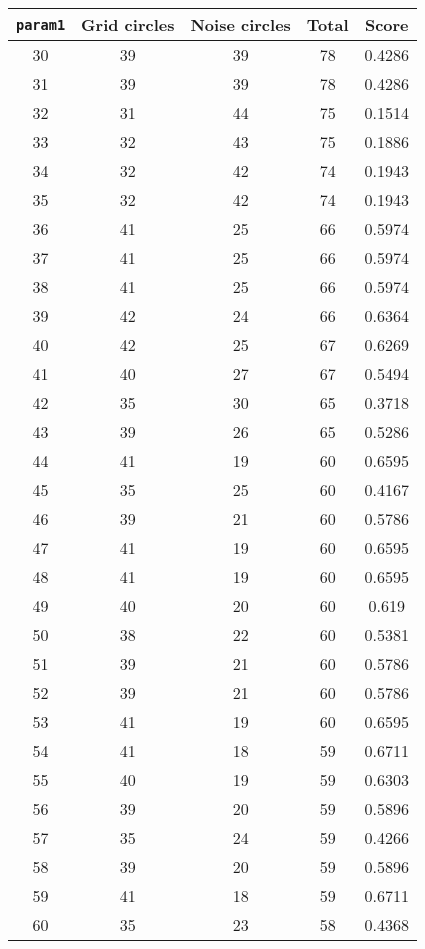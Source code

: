 \documentclass[letterpaper, 12pt]{article}
\begin{document}
\begin{longtable}{|c|c|c|c|c|}
\hline
\textbf{\texttt{param1}} & \textbf{Grid circles} & \textbf{Noise circles} & \textbf{Total} & \textbf{Score} \\
\hline
30 & 39 & 39 & 78 & 0.4286 \\
\hline
31 & 39 & 39 & 78 & 0.4286 \\
\hline
32 & 31 & 44 & 75 & 0.1514 \\
\hline
33 & 32 & 43 & 75 & 0.1886 \\
\hline
34 & 32 & 42 & 74 & 0.1943 \\
\hline
35 & 32 & 42 & 74 & 0.1943 \\
\hline
36 & 41 & 25 & 66 & 0.5974 \\
\hline
37 & 41 & 25 & 66 & 0.5974 \\
\hline
38 & 41 & 25 & 66 & 0.5974 \\
\hline
39 & 42 & 24 & 66 & 0.6364 \\
\hline
40 & 42 & 25 & 67 & 0.6269 \\
\hline
41 & 40 & 27 & 67 & 0.5494 \\
\hline
42 & 35 & 30 & 65 & 0.3718 \\
\hline
43 & 39 & 26 & 65 & 0.5286 \\
\hline
44 & 41 & 19 & 60 & 0.6595 \\
\hline
45 & 35 & 25 & 60 & 0.4167 \\
\hline
46 & 39 & 21 & 60 & 0.5786 \\
\hline
47 & 41 & 19 & 60 & 0.6595 \\
\hline
48 & 41 & 19 & 60 & 0.6595 \\
\hline
49 & 40 & 20 & 60 & 0.619 \\
\hline
50 & 38 & 22 & 60 & 0.5381 \\
\hline
51 & 39 & 21 & 60 & 0.5786 \\
\hline
52 & 39 & 21 & 60 & 0.5786 \\
\hline
53 & 41 & 19 & 60 & 0.6595 \\
\hline
54 & 41 & 18 & 59 & 0.6711 \\
\hline
55 & 40 & 19 & 59 & 0.6303 \\
\hline
56 & 39 & 20 & 59 & 0.5896 \\
\hline
57 & 35 & 24 & 59 & 0.4266 \\
\hline
58 & 39 & 20 & 59 & 0.5896 \\
\hline
59 & 41 & 18 & 59 & 0.6711 \\
\hline
60 & 35 & 23 & 58 & 0.4368 \\

\end{longtable}
\end{document}
